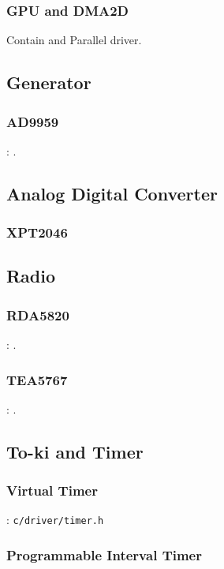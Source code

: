 \subsubsection{GPU and DMA2D}

Contain  and {Parallel} driver.

\subsection{Generator}

\subsubsection{AD9959}

: .

\subsection{Analog Digital Converter}

\subsubsection{XPT2046}

\subsection{Radio}

\subsubsection{RDA5820}

: .

\subsubsection{TEA5767}

: .

\subsection{To-ki and Timer}
\subsubsection{Virtual Timer}
: \verb`c/driver/timer.h`

\subsubsection{Programmable Interval Timer}
